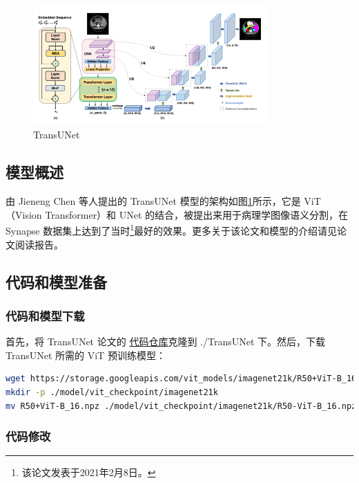 \documentclass[hyperref,a4paper,UTF8]{ctexart}
\begin{document}
\begin{figure}[h]
    \centering
    \includegraphics[width=0.8\textwidth]{figures/TransUNet.png}
    \caption{TransUNet}
    \label{fig:TransUNet}
\end{figure}

\subsection{模型概述}

由 Jieneng Chen 等人提出的 TransUNet 模型\cite{ref1}的架构如图\ref{fig:TransUNet}所示，它是 ViT（Vision Transformer）和 UNet 的结合，被提出来用于病理学图像语义分割，在 Synapse 数据集上达到了当时\footnote{该论文发表于2021年2月8日。}最好的效果。更多关于该论文和模型的介绍请见论文阅读报告。

\subsection{代码和模型准备}

\subsubsection{代码和模型下载}

首先，将 TransUNet 论文的 \href{https://github.com/Beckschen/TransUNet}{代码仓库}克隆到 ./TransUNet 下。然后，下载 TransUNet 所需的 ViT 预训练模型：

\begin{lstlisting}[language=bash]
wget https://storage.googleapis.com/vit_models/imagenet21k/R50+ViT-B_16.npz
mkdir -p ./model/vit_checkpoint/imagenet21k
mv R50+ViT-B_16.npz ./model/vit_checkpoint/imagenet21k/R50-ViT-B_16.npz
\end{lstlisting}

\subsubsection{代码修改}
\end{document}
